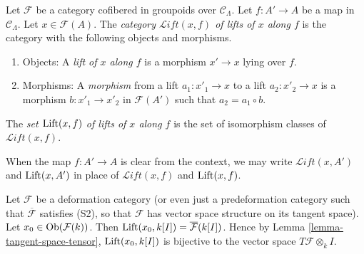 \begin{definition}
\label{definition-lifts}
Let $\mathcal F$ be a category cofibered in groupoids over $\mathcal 
C_{\Lambda}$.  Let $f: A' \rightarrow A$ be a map in $\mathcal C_{\Lambda}$.  
Let $x \in \mathcal F(A)$.  The {\it category $\mathcal{L}\textit{ift}(x,f)$ 
of lifts of $x$ along $f$} is the category with the following objects and 
morphisms. 
\begin{enumerate}
\item Objects: A {\it lift of $x$ along $f$} is a morphism $x' \rightarrow x$ 
lying over $f$.  
\item Morphisms: A {\it morphism} from a lift $a_1: x'_{1} \rightarrow x$ to a 
lift $a_2: x'_{2} \rightarrow x$ is a morphism $b: x'_1 \rightarrow x'_2$ in 
$\mathcal F(A')$ such that $a_2 = a_1 \circ b$.
\end{enumerate}
The {\it set $\textnormal{Lift}(x,f)$ of lifts of $x$ along $f$} is the set of 
isomorphism classes of $\mathcal{L}\textit{ift}(x,f)$.
\end{definition}

\begin{remark}
\label{remark-omit-arrow}
When the map $f: A' \rightarrow A$ is clear from the context, we may write 
$\mathcal{L}\textit{ift}(x,A')$ and $\textnormal{Lift}(x,A')$ in place of 
$\mathcal{L}\textit{ift}(x,f)$ and $\textnormal{Lift}(x,f)$. 
\end{remark}

\begin{remark}
\label{remark-tangent-space-lifting}
Let $\mathcal F$ be a deformation category (or even just a predeformation 
category such that $\overline{\mathcal F}$ satisfies (S2), so that $\mathcal F$ 
has vector space structure on its tangent space).  Let $x_0 \in 
\textnormal{Ob}(\mathcal F(k))$.  Then $\textnormal{Lift}(x_0, k[I]) = 
\overline{\mathcal F}(k[I])$. Hence by Lemma \ref{lemma-tangent-space-tensor}, 
$\textnormal{Lift}(x_0, k[I])$ is bijective to the vector space $T\mathcal F 
\otimes_{k} I$.
\end{remark}

